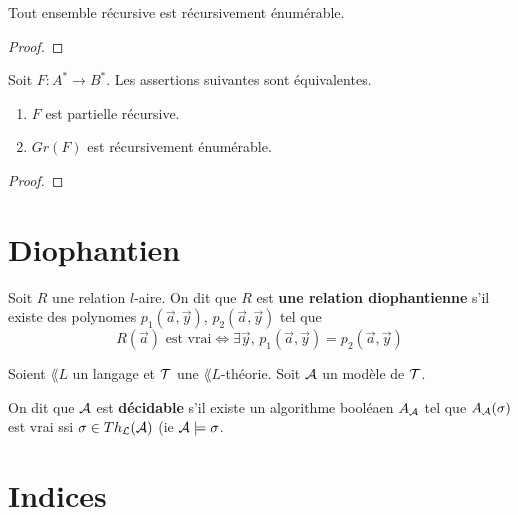 \begin{proposition}
	Tout ensemble récursive est récursivement énumérable.
\end{proposition}

\ifdefined\outputproof
\begin{proof}

\end{proof}
\fi

\begin{proposition}
	Soit $F : A^{*} \rightarrow B^{*}$. Les assertions suivantes sont
	équivalentes.

	\begin{enumerate}
		\item $F$ est partielle récursive.
		\item $Gr(F)$ est récursivement énumérable.
	\end{enumerate}
\end{proposition}

\ifdefined\outputproof
\begin{proof}

\end{proof}
\fi

\section{Diophantien}

\begin{definition}
	Soit $R$ une relation $l$-aire.
	On dit que $R$ est \textbf{une relation diophantienne} s'il existe des
	polynomes $p_{1}(\vec{a}, \vec{y})$, $p_{2}(\vec{a}, \vec{y})$ tel que
	\begin{equation}
		R(\vec{a}) \text{ est vrai} \Leftrightarrow \exists \vec{y}, \,
		p_{1}(\vec{a}, \vec{y}) = p_{2}(\vec{a}, \vec{y})
	\end{equation}
\end{definition}

\begin{definition}
	Soient $\lang{L}$ un langage et $\mathcal{T}$ une $\lang{L}$-théorie.
	Soit $\mathcal{A}$ un modèle de $\mathcal{T}$.

	On dit que $\mathcal{A}$ est \textbf{décidable} s'il existe un algorithme
	booléaen
	$A_{\mathcal{A}}$ tel que $A_{\mathcal{A}}(\sigma)$ est vrai ssi $\sigma \in
	Th_{\mathcal{L}}(\mathcal{A})$ (ie $\mathcal{A} \models \sigma$.
\end{definition}

\section{Indices}

